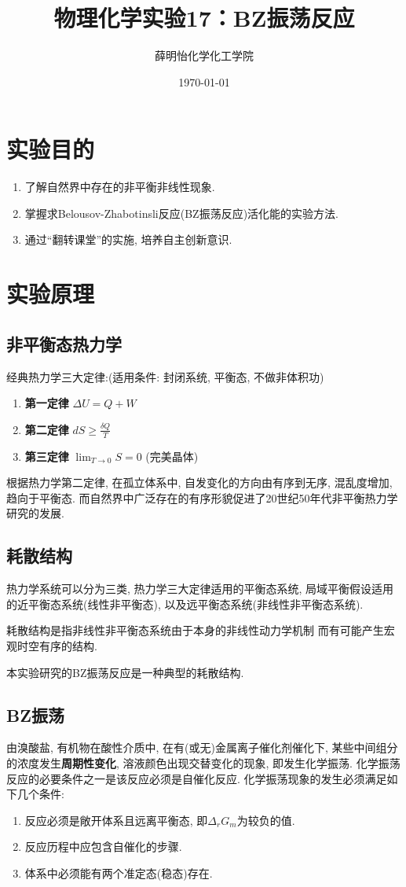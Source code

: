 \documentclass[a4paper]{article}
\title{物理化学实验17：BZ振荡反应}
\author{薛明怡\quad 151250177\quad 化学化工学院}
\date{\today}
\begin{document}
\maketitle

\section{实验目的}
\begin{enumerate}
\item 了解自然界中存在的非平衡非线性现象.
\item 掌握求Belousov-Zhabotinsli反应(BZ振荡反应)活化能的实验方法.
\item 通过``翻转课堂''的实施, 培养自主创新意识.
\end{enumerate}
\section{实验原理}
\subsection{非平衡态热力学}
经典热力学三大定律:(适用条件: 封闭系统, 平衡态, 不做非体积功)
\begin{enumerate}
	\item \textbf{第一定律} $\Delta U=Q+W$
	\item \textbf{第二定律} $dS\ge \frac{\delta Q}{T}$
	\item \textbf{第三定律} $\lim_{T \to 0}S=0$ (完美晶体)
\end{enumerate}	
\par
根据热力学第二定律, 在孤立体系中, 
自发变化的方向由有序到无序, 混乱度增加,趋向于平衡态. 
而自然界中广泛存在的有序形貌促进了20世纪50年代非平衡热力学研究的发展.

\subsection{耗散结构}
热力学系统可以分为三类, 热力学三大定律适用的平衡态系统, 
局域平衡假设适用的近平衡态系统(线性非平衡态), 
以及远平衡态系统(非线性非平衡态系统).\par
耗散结构是指非线性非平衡态系统由于本身的非线性动力学机制
而有可能产生宏观时空有序的结构.\par
本实验研究的BZ振荡反应是一种典型的耗散结构.
\subsection{BZ振荡}
由溴酸盐, 有机物在酸性介质中, 在有(或无)金属离子催化剂催化下, 
某些中间组分的浓度发生\textbf{周期性变化}, 溶液颜色出现交替变化的现象, 即发生化学振荡.
化学振荡反应的必要条件之一是该反应必须是自催化反应. 化学振荡现象的发生必须满足如下几个条件:
\begin{enumerate}
    \item 反应必须是敞开体系且远离平衡态, 即$\Delta_{r} G_{m}$为较负的值.
    \item 反应历程中应包含自催化的步骤.
    \item 体系中必须能有两个准定态(稳态)存在.
\end{enumerate}
\end{document}

